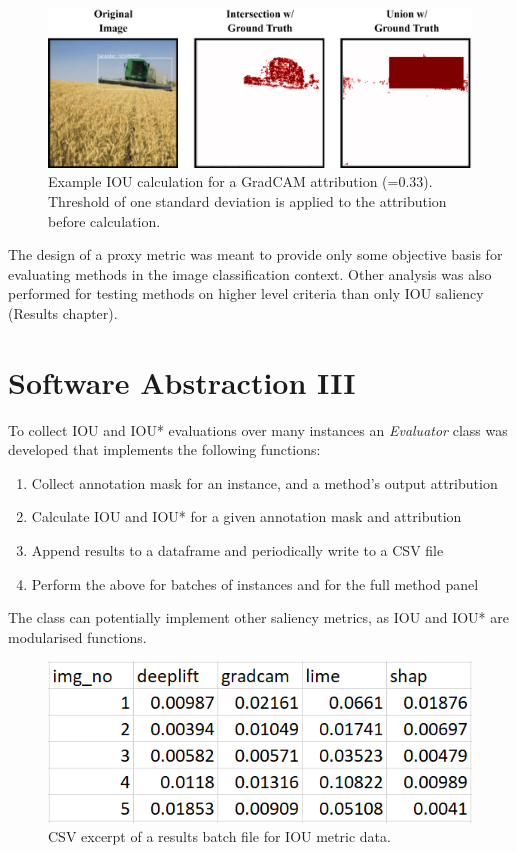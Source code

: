 \documentclass[main]{subfiles}
\begin{document}
\begin{figure}[htbp]
\centering
\includegraphics[scale=0.22]{iou_example.png}
\caption{Example IOU calculation for a GradCAM attribution  (=0.33). Threshold of one standard deviation is applied to the attribution before calculation.}
\label{iou_example_img}
\end{figure}

\newpage

The design of a proxy metric was meant to provide only some objective basis for evaluating methods in the image classification context. Other analysis was also performed for testing methods on higher level criteria than only IOU saliency (Results chapter).


\section{Software Abstraction III}  \label{sec:sw3}

To collect IOU and IOU* evaluations over many instances an \textit{Evaluator} class was developed that implements the following functions:
\begin{enumerate}
\item Collect annotation mask for an instance, and a method's output attribution
\item Calculate IOU and IOU* for a given annotation mask and attribution
\item Append results to a dataframe and periodically write to a CSV file
\item Perform the above for batches of instances and for the full method panel
\end{enumerate}

The class can potentially implement other saliency metrics, as IOU and IOU* are modularised functions.

\begin{figure}[htbp]
\centering
\includegraphics[scale=0.4]{csv_output.png}
\caption{CSV excerpt of a results batch file for IOU metric data.}
\label{csv_image}
\end{figure}
\end{document}
